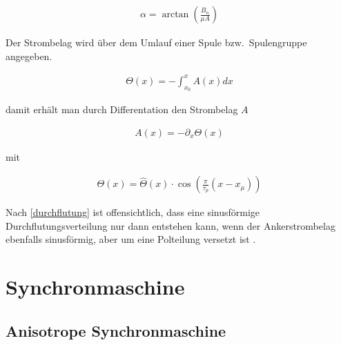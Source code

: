 \begin{align}
\alpha = \arctan(\frac{B_n}{\mu A}) \label{strombelagwinkel}
\end{align}

Der Strombelag wird über dem Umlauf einer Spule bzw.\ Spulengruppe angegeben.

\begin{align}
\Theta(x) = - \int_{x_0}^{x} A(x)dx \label{durchflutung}
\end{align}

damit erhält man durch Differentation den Strombelag $A$

\begin{align}
A(x) = -\partial_x \Theta(x) \label{Strombelag}
\end{align}

mit

\begin{align}
\Theta(x) = \hat{\Theta}(x)\cdot \cos(\frac{\pi}{\tau_p}(x-x_\mu)) \label{adurchflutung}
\end{align}

Nach \ref{durchflutung} ist offensichtlich, dass eine sinusförmige Durchflutungsverteilung nur dann entstehen kann, wenn der Ankerstrombelag ebenfalls sinusförmig, aber um eine Polteilung versetzt ist \parencite[S.~247]{mullerI2005}.


\section{Synchronmaschine}\label{sec:synchron}



\subsection{Anisotrope Synchronmaschine}\label{sec:anisosynchron}


